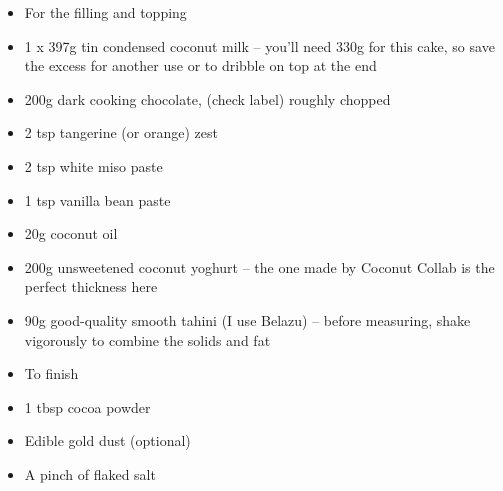 \documentclass{book}
\begin{document}
\begin{itemize}
\item For the filling and topping
\item 1 x 397g tin condensed coconut milk – you’ll need 330g for this cake, so save the excess for another use or to dribble on top at the end
\item 200g dark cooking chocolate, (check label) roughly chopped
\item 2 tsp tangerine (or orange) zest
\item 2 tsp white miso paste
\item 1 tsp vanilla bean paste
\item 20g coconut oil
\item 200g unsweetened coconut yoghurt – the one made by Coconut Collab is the perfect thickness here
\item 90g good-quality smooth tahini (I use Belazu) – before measuring, shake vigorously to combine the solids and fat
\end{itemize}

\begin{itemize}
\item To finish
\item 1 tbsp cocoa powder
\item Edible gold dust (optional)
\item A pinch of flaked salt
\end{itemize}
\end{document}

